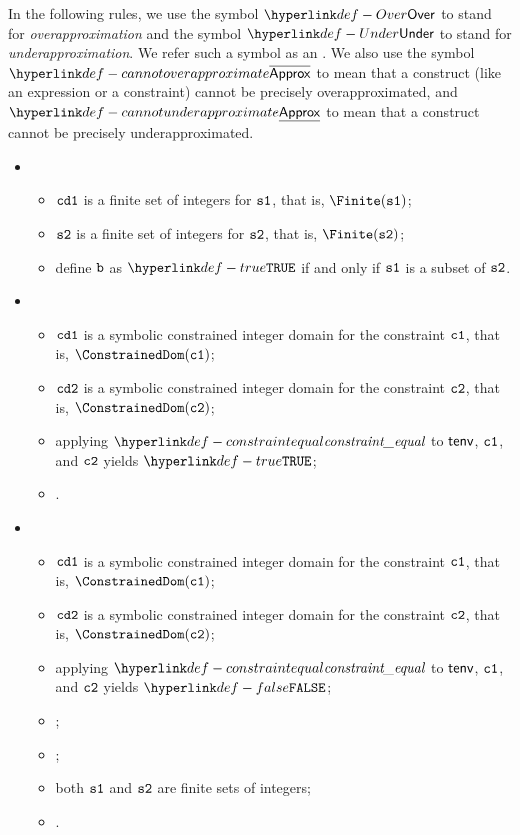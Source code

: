 \hypertarget{def-Under}{}
\hypertarget{def-Over}{}
\hypertarget{def-cannotoverapproximate}{}
\hypertarget{def-cannotunderapproximate}{}
\hypertarget{def-approximationdirectionterm}{}
In the following rules, we use the symbol $\Over$ to stand for \emph{overapproximation}
and the symbol $\Under$ to stand for \emph{underapproximation}.
We refer such a symbol as an \approximationdirectionterm.
We also use the symbol $\CannotOverapproximate$ to mean that a construct
(like an expression or a constraint) cannot be precisely overapproximated,
and $\CannotUnderapproximate$ to mean that a construct cannot be precisely
underapproximated.

\ProseParagraph
\OneApplies
\begin{itemize}
  \item {}
  \begin{itemize}
    \item $\texttt{cd1}$ is a finite set of integers for $\vsone$, that is, $\Finite(\vsone)$;
    \item $\vstwo$ is a finite set of integers for $\vstwo$, that is, $\Finite(\vstwo)$;
    \item define $\vb$ as $\True$ if and only if $\vsone$ is a subset of $\vstwo$.
  \end{itemize}

  \item {}
  \begin{itemize}
    \item $\texttt{cd1}$ is a symbolic constrained integer domain for the constraint $\vcone$, that is, $\ConstrainedDom(\vcone)$;
    \item $\texttt{cd2}$ is a symbolic constrained integer domain for the constraint $\vctwo$, that is, $\ConstrainedDom(\vctwo)$;
    \item applying $\constraintequal$ to $\tenv$, $\vcone$, and $\vctwo$ yields $\True$;
    \item \Proseeqdef{$\vb$}{$\True$}.
  \end{itemize}

  \item {}
  \begin{itemize}
    \item $\texttt{cd1}$ is a symbolic constrained integer domain for the constraint $\vcone$, that is, $\ConstrainedDom(\vcone)$;
    \item $\texttt{cd2}$ is a symbolic constrained integer domain for the constraint $\vctwo$, that is, $\ConstrainedDom(\vctwo)$;
    \item applying $\constraintequal$ to $\tenv$, $\vcone$, and $\vctwo$ yields $\False$;
    \item \Proseapproxconstraint{$\tenv$}{$\vcone$}{$\Over$}{$\vsone$};
    \item \Proseapproxconstraint{$\tenv$}{$\vctwo$}{$\Under$}{$\vstwo$};
    \item both $\vsone$ and $\vstwo$ are finite sets of integers;
    \item {}.
  \end{itemize}


\end{itemize}
